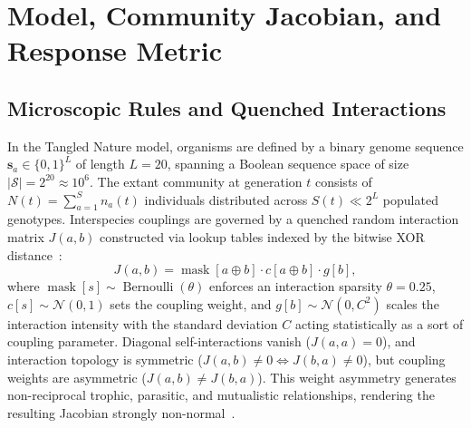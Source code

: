 \documentclass[twocolumn,amsmath,amssymb,aps,pra,10pt,floatfix,nofootinbib]{revtex4-2}
\begin{document}
\section{Model, Community Jacobian, and Response Metric}
\label{sec:model}

\subsection{Microscopic Rules and Quenched Interactions}

In the Tangled Nature model, organisms are defined by a binary genome sequence $\mathbf{s}_a \in \{0,1\}^L$ of length $L = 20$, spanning a Boolean sequence space of size $|\mathcal{S}| = 2^{20} \approx 10^6$. The extant community at generation $t$ consists of $N(t) = \sum_{a=1}^S n_a(t)$ individuals distributed across $S(t) \ll 2^L$ populated genotypes. Interspecies couplings are governed by a quenched random interaction matrix $J(a,b)$ constructed via lookup tables indexed by the bitwise XOR distance~\cite{rudyarthur-tnm}:
\begin{equation}
J(a,b) = \operatorname{mask}[a \oplus b] \cdot c[a \oplus b] \cdot g[b],
\label{eq:J}
\end{equation}
where $\operatorname{mask}[s] \sim \operatorname{Bernoulli}(\theta)$ enforces an interaction sparsity $\theta = 0.25$, $c[s] \sim \mathcal{N}(0, 1)$ sets the coupling weight, and $g[b] \sim \mathcal{N}(0, C^2)$ scales the interaction intensity with the standard deviation $C$ acting statistically as a sort of coupling parameter. Diagonal self-interactions vanish ($J(a,a) = 0$), and interaction topology is symmetric ($J(a,b) \neq 0 \iff J(b,a) \neq 0$), but coupling weights are asymmetric ($J(a,b) \neq J(b,a)$). This weight asymmetry generates non-reciprocal trophic, parasitic, and mutualistic relationships, rendering the resulting Jacobian strongly non-normal~\cite{trefethen2005spectra}.
\end{document}
